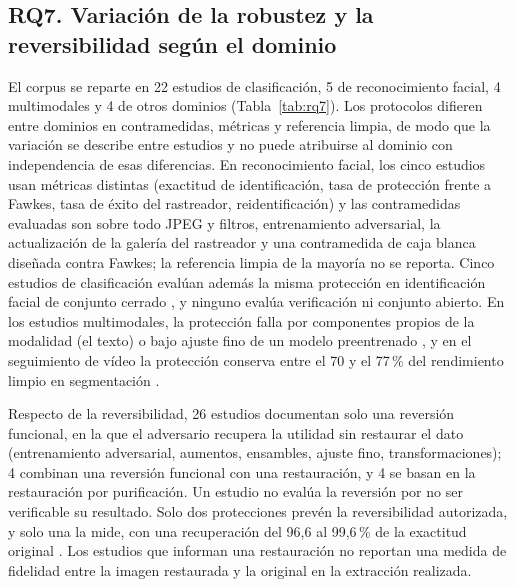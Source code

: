 \documentclass[pdflatex,sn-mathphys-num]{sn-jnl}
\theoremstyle{thmstyleone}
\theoremstyle{thmstyletwo}
\theoremstyle{thmstylethree}
\begin{document}
\subsection{RQ7. Variación de la robustez y la reversibilidad según el dominio}

El corpus se reparte en 22 estudios de clasificación, 5 de reconocimiento facial, 4 multimodales y 4 de otros dominios (Tabla~\ref{tab:rq7}). Los protocolos difieren entre dominios en contramedidas, métricas y referencia limpia, de modo que la variación se describe entre estudios y no puede atribuirse al dominio con independencia de esas diferencias. En reconocimiento facial, los cinco estudios usan métricas distintas (exactitud de identificación, tasa de protección frente a Fawkes, tasa de éxito del rastreador, reidentificación) y las contramedidas evaluadas son sobre todo JPEG y filtros, entrenamiento adversarial, la actualización de la galería del rastreador y una contramedida de caja blanca diseñada contra Fawkes; la referencia limpia de la mayoría no se reporta. Cinco estudios de clasificación evalúan además la misma protección en identificación facial de conjunto cerrado \cite{gong2026armor,chen2025eun,liu2024stable,zhang2023cleanlabel,dolatabadi2024devil}, y ninguno evalúa verificación ni conjunto abierto. En los estudios multimodales, la protección falla por componentes propios de la modalidad (el texto) o bajo ajuste fino de un modelo preentrenado \cite{li2025crossmodal,liu2024multimodal}, y en el seguimiento de vídeo la protección conserva entre el 70 y el 77\,\% del rendimiento limpio en segmentación \cite{wu2025temporal}.

Respecto de la reversibilidad, 26 estudios documentan solo una reversión funcional, en la que el adversario recupera la utilidad sin restaurar el dato (entrenamiento adversarial, aumentos, ensambles, ajuste fino, transformaciones); 4 combinan una reversión funcional con una restauración, y 4 se basan en la restauración por purificación. Un estudio no evalúa la reversión por no ser verificable su resultado. Solo dos protecciones prevén la reversibilidad autorizada, y solo una la mide, con una recuperación del 96,6 al 99,6\,\% de la exactitud original \cite{wang2026reversible}. Los estudios que informan una restauración no reportan una medida de fidelidad entre la imagen restaurada y la original en la extracción realizada.%
{}
\end{document}
